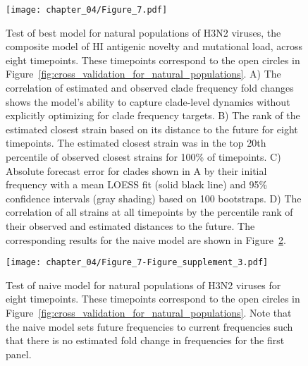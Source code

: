 \begin{figure}
  \texttt{[image: chapter\_04/Figure\_7.pdf]}
  \caption{
  Test of best model for natural populations of H3N2 viruses, the composite model of HI antigenic novelty and mutational load, across eight timepoints.
  These timepoints correspond to the open circles in Figure~\ref{fig:cross_validation_for_natural_populations}.
  A) The correlation of estimated and observed clade frequency fold changes shows the model's ability to capture clade-level dynamics without explicitly optimizing for clade frequency targets.
  B) The rank of the estimated closest strain based on its distance to the future for eight timepoints.
  The estimated closest strain was in the top 20th percentile of observed closest strains for 100\% of timepoints.
  C) Absolute forecast error for clades shown in A by their initial frequency with a mean LOESS fit (solid black line) and 95\% confidence intervals (gray shading) based on 100 bootstraps.
  D) The correlation of all strains at all timepoints by the percentile rank of their observed and estimated distances to the future.
  The corresponding results for the naive model are shown in Figure~\ref{fig:test_of_naive_model_for_natural_populations}.
  }
  \label{fig:test_of_best_model_for_natural_populations}
\end{figure}

\begin{figure}
  \texttt{[image: chapter\_04/Figure\_7-Figure\_supplement\_3.pdf]}
  \caption{
    Test of naive model for natural populations of H3N2 viruses for eight timepoints.
    These timepoints correspond to the open circles in Figure~\ref{fig:cross_validation_for_natural_populations}.
    Note that the naive model sets future frequencies to current frequencies such that there is no estimated fold change in frequencies for the first panel.
  }
  \label{fig:test_of_naive_model_for_natural_populations}
\end{figure}

